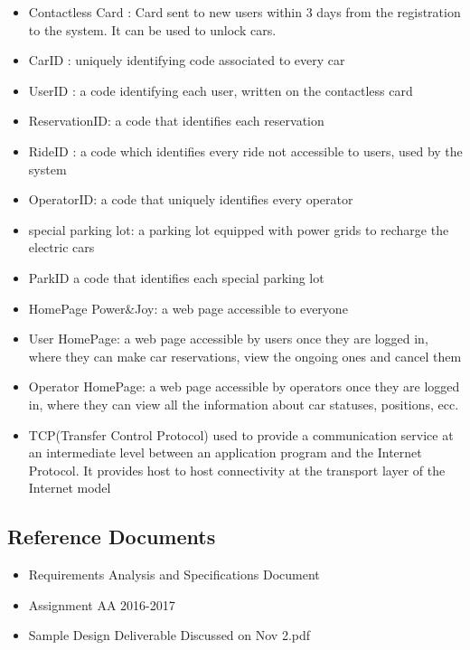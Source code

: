 \documentclass{article}
\begin{document}
\begin{flushleft}
\begin {itemize}
\item Contactless Card : Card sent to new users within 3 days from the registration to the system. It can be used to unlock cars.
\item CarID : uniquely identifying code associated to every car
\item UserID : a code identifying each user, written on the contactless card
\item ReservationID: a code that identifies each reservation
\item RideID : a code which identifies every ride not accessible to users, used by the system 
\item OperatorID: a code that uniquely identifies every operator
\item special parking lot: a parking lot equipped with power grids to recharge the electric cars
\item ParkID a code that identifies each special parking lot
\item HomePage Power\&Joy: a web page accessible to everyone
\item User HomePage: a web page accessible by users once they are logged in, where they can make car reservations, view the ongoing ones and cancel them
\item Operator HomePage: a web page accessible by operators once they are logged in, where they can view all the information about car statuses,  positions, ecc.
\item TCP(Transfer Control Protocol)  used to provide a communication service at an intermediate level between an application program and the Internet Protocol. It provides  host to host connectivity at the transport layer of the Internet model


\end{itemize}

\subsection{Reference Documents} %
\begin {itemize}
\item  Requirements Analysis and Specifications Document
\item Assignment AA 2016-2017
\item Sample Design Deliverable Discussed on Nov 2.pdf

\end{itemize}


\end{flushleft}
\end{document}
